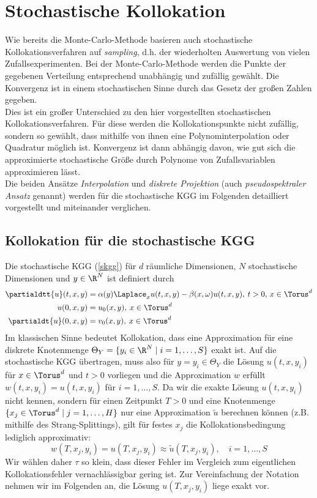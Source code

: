 
\chapter{Stochastische Kollokation}
\label{Chapter4}
Wie bereits die Monte-Carlo-Methode basieren auch stochastische Kollokationsverfahren auf \emph{sampling}, d.h. der wiederholten Auswertung von vielen Zufallsexperimenten. Bei der Monte-Carlo-Methode werden die Punkte der gegebenen Verteilung entsprechend unabhängig und zufällig gewählt. Die Konvergenz ist in einem stochastischen Sinne durch das Gesetz der großen Zahlen gegeben.\\
Dies ist ein großer Unterschied zu den hier vorgestellten stochastischen Kollokationsverfahren. Für diese werden die Kollokationspunkte nicht zufällig, sondern so gewählt, dass mithilfe von ihnen eine Polynominterpolation oder Quadratur möglich ist. Konvergenz ist dann abhängig davon, wie gut sich die approximierte stochastische Größe durch Polynome von Zufallsvariablen approximieren lässt.\\
Die beiden Ansätze \emph{Interpolation} und \emph{diskrete Projektion} (auch \emph{pseudospektraler Ansatz} genannt) werden für die stochastische KGG im Folgenden detailliert vorgestellt und miteinander verglichen.
\section*{Kollokation für die stochastische KGG}
Die stochastische KGG (\ref{skgg}) für $d$ räumliche Dimensionen, $N$ stochastische Dimensionen und $y\in\R^N$ ist definiert durch
\begin{align*}
\partialdtt{u}(t,x,y)&=\alpha(y) \Laplace_x u(t,x,y) - \beta(x,\omega)u(t,x,y), \: t>0, \, x\in \Torus^d\\
u(0,x,y)&=u_0(x,y), \: x\in \Torus^d\\
\partialdt{u}(0,x,y)&=v_0(x,y), \: x\in \Torus^d
\end{align*}
Im klassischen Sinne bedeutet Kollokation, dass eine Approximation für eine diskrete Knotenmenge $\Theta_Y=\lbrace y_i\in\R^N\mid i=1,\dots,S\rbrace$ exakt ist. Auf die stochastische KGG übertragen, muss also für $y=y_i\in\Theta_Y$ die Lösung $u(t,x,y_i)$ für $x\in\Torus^d$ und $t>0$ vorliegen und die Approximation $w$ erfüllt $w(t,x,y_i)=u(t,x,y_i)$ für $i=1,\dots,S$. Da wir die exakte Lösung $u(t,x,y_i)$ nicht kennen, sondern für einen Zeitpunkt $T>0$ und eine Knotenmenge $\lbrace x_j\in\Torus^d\mid j=1,\dots,H\rbrace$ nur eine Approximation $\tilde{u}$ berechnen können (z.B. mithilfe des Strang-Splittings), gilt für festes $x_j$ die Kollokationsbedingung lediglich approximativ:
\[w(T,x_j,y_i)=u(T,x_j,y_i)\approx \tilde{u}(T,x_j,y_i),\quad i=1,\dots,S\]
Wir wählen daher $\tau$ so klein, dass dieser Fehler im Vergleich zum eigentlichen Kollokationsfehler vernachlässigbar gering ist. Zur Vereinfachung der Notation nehmen wir im Folgenden an, die Lösung $u(T,x_j,y_i)$ liege exakt vor.

